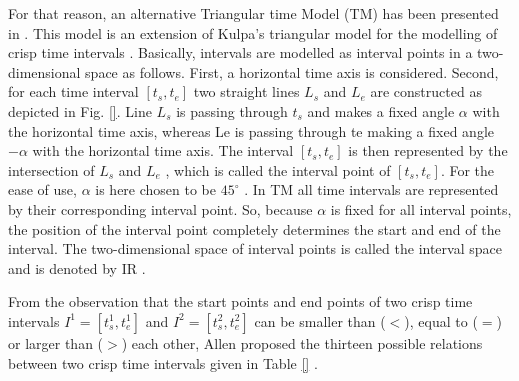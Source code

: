 For that reason, an alternative Triangular time Model (TM) has been presented in \cite{Weghe2007}. This model is an extension of Kulpa's triangular model for the modelling of crisp time intervals \cite{Kulpa1997}. Basically, intervals are modelled as interval points in a two-dimensional space as follows. First, a horizontal time axis is considered. Second, for each time interval $\left[t_s, t_e \right]$ two straight lines $L_s$ and $L_e$ are constructed as depicted in Fig. \ref{}. Line $L_s$ is passing through $t_s$ and makes a fixed angle $\alpha$ with the horizontal time axis, whereas Le is passing through te making a fixed angle $-\alpha$ with the horizontal time axis. The interval $\left[t_s, t_e \right]$ is then represented by the intersection of $L_s$ and $L_e$ , which is called the interval point of $\left[t_s, t_e \right]$. For the ease of use, $\alpha$ is here chosen to be $45^{\circ}$ . In TM all time intervals are represented by their corresponding interval point. So, because $\alpha$ is fixed for all interval points, the position of the interval point completely determines the start and end of the interval. The two-dimensional space of interval points is called the interval space and is denoted by IR \cite{Kulpa2006}.


From the observation that the start points and end points of two crisp time intervals $I^{1} = \left[t_s^1, t_e^1 \right]$ and $I^2 = \left[t_s^2, t_e^2 \right]$ can be smaller than ($<$), equal to ($=$) or larger than ($>$) each other, Allen proposed the thirteen possible relations between two crisp time intervals given in Table \ref{} \cite{Allen1983}.








